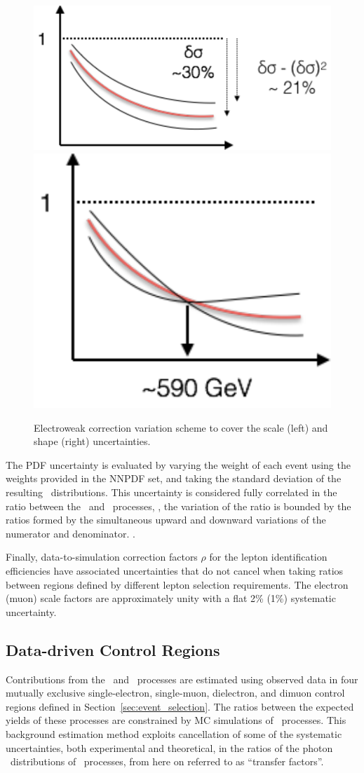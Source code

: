 \begin{figure}[htbp]
  \centering
  \includegraphics[height=0.3\textwidth]{Analysis/Figures/ewkcorr/scale.pdf}
  \includegraphics[height=0.3\textwidth]{Analysis/Figures/ewkcorr/shape.pdf}
  \caption{
    Electroweak correction variation scheme to cover the scale (left) and shape (right) uncertainties.
  }
  \label{fig:ewk_correction_cartoon}
\end{figure}

The PDF uncertainty is evaluated by varying the weight of each event using the weights provided in the NNPDF set, and taking the standard deviation of the resulting \ETg\ distributions. 
This uncertainty is considered fully correlated in the ratio between the \zinvg\ and \wlng\ processes, \ie, the variation of the ratio is bounded by the ratios formed by the simultaneous upward and downward variations of the numerator and denominator. .

Finally, data-to-simulation correction factors $\rho$ for the lepton identification efficiencies have associated uncertainties that do not cancel when taking ratios between regions defined by different lepton selection requirements.
The electron (muon) scale factors are approximately unity with a flat 2\% (1\%) systematic uncertainty.

\subsection{Data-driven Control Regions}
\label{sec:control_regions}

Contributions from the \zinvg\ and \wlng\ processes are estimated using observed data in four mutually exclusive single-electron, single-muon, dielectron, and dimuon control regions defined in Section~\ref{sec:event_selection}. 
The ratios between the expected yields of these processes are constrained by MC simulations of \vg\ processes. This background estimation method exploits cancellation of some of the systematic uncertainties, both experimental and theoretical, in the ratios of the photon \ETg\ distributions of \vg\ processes, from here on referred to as ``transfer factors''.
 
